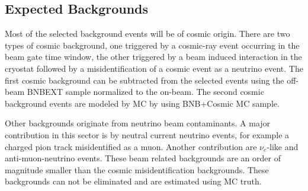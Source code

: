 \begin{table}[!htp] \centering 
  \caption{Passing rates for Selection I selection applied to on-beam and off-beam data. The numbers in brackets give the passing rate wrt the step before (first percentage) and wrt the generated events (second percentage). Off-beam data has been scaled with a factor 1.23 to normalize to the on-beam data stream.} 
  \label{table:data} 
\small 
{} 
\end{table} 
\subsection{Expected Backgrounds}
Most of the selected background events will be of cosmic origin. There are two types of cosmic background, one triggered by a cosmic-ray event occurring in the beam gate time window, the other triggered by a beam induced interaction in the cryostat followed by a misidentification of a cosmic event as a neutrino event. The first cosmic background can be subtracted from the selected events using the off-beam BNBEXT sample normalized to the on-beam. The second cosmic background events are modeled by MC by using BNB+Cosmic MC sample. 

Other backgrounds originate from neutrino beam contaminants. A major contribution in this sector is by neutral current neutrino events, for example a charged pion track misidentified as a muon. Another contribution are $\nu_e$-like and anti-muon-neutrino events. These beam related backgrounds are an order of magnitude smaller than the cosmic misidentification backgrounds. These backgrounds can not be eliminated and are estimated using MC truth.

